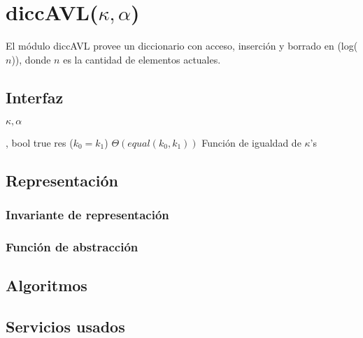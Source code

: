 \section{diccAVL($\kappa, \alpha$)}

El módulo diccAVL provee un diccionario con acceso, inserción y borrado en \bigo(log($n$)), donde $n$ es la cantidad de elementos actuales.

\subsection{Interfaz}

\begin{iparamformales}{$\kappa, \alpha$}

    \funcion{$\bullet = \bullet$} %
        {, } %
        {bool} %
        {true} %
        {res \igobs ($k_0 = k_1$)} %
        {$\Theta(equal(k_0, k_1))$} %
        {} %
        {Función de igualdad de $\kappa$'s} %

\end{iparamformales}

\iusa{}

\subsection{Representación}

\subsubsection{Invariante de representación}

\subsubsection{Función de abstracción}

\subsection{Algoritmos}

\subsection{Servicios usados}


